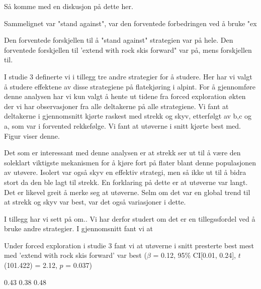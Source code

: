 \documentclass[letterpaper,10pt]{article}
\begin{document}
Så komme med en diskusjon på dette her. 

 


Sammelignet var "stand against", var den forventede forbedringen ved å bruke "ex


Den forventede forskjellen til å "stand against" strategien var på hele. Den forventede forskjellen til 'extend with rock skis forward" var på, mens forskjellen til. 








I studie 3 definerte vi i tillegg tre andre strategier for å studere. Her har vi valgt å studere effektene av disse strategiene på flatekjøring i alpint. For å gjennomføre denne analysen har vi kun valgt å hente ut tidene fra forced exploration økten der vi har observasjoner fra alle deltakerne på alle strategiene. Vi fant at deltakerne i gjennomsnitt kjørte raskest med strekk og skyv, etterfølgt av b,c og a, som var i forvented rekkefølge. Vi fant at utøverne i snitt kjørte best med. Figur viser denne. 

Det som er interessant med denne analysen er at strekk ser ut til å være den soleklart viktigste mekanismen for å kjøre fort på flater blant denne populasjonen av utøvere. Isolert var også skyv en effektiv strategi, men så ikke ut til å bidra stort da den ble lagt til strekk. En forklaring på dette er at utøverne var langt. Det er likevel greit å merke seg at utøverne. Selm om det var en global trend til at strekk og skyv var best, var det også variasjoner i dette. 

I tillegg har vi sett på om.. Vi har derfor studert om det er en tillegssfordel ved å bruke andre strategier. I gjennomsnitt fant vi at 



Under forced exploration i studie 3 fant vi at utøverne i snitt presterte best mest med 'extend with rock skis forward' var best  ($\beta$ = 0.12, 95\% CI[0.01, 0.24], $t$(101.422) = 2.12, $p$ = 0.037)

0.43   0.38   0.48 
\end{document}
